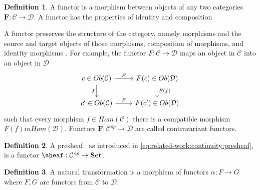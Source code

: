 \documentclass[10pt,journal,compsoc]{IEEEtran}
\theoremstyle{definition}
\newtheorem{definition}{Definition}[section]
\theoremstyle{remark}
\begin{document}
 \begin{definition} A functor is a morphism between objects of any two  categories $\bm{F}: \mathcal{C} \rightarrow \mathcal{D}$. A functor has the properties of identity and composition \cite{riehlCategoryTheoryContext}\end{definition}

A functor preserves the structure of the category, namely morphisms and the source and target objects of those morphisms, composition of morphisms, and identity morphisms \cite{riehlCategoryTheoryContext}. For example, the functor $F:\mathcal{C} \rightarrow \mathcal{D}$ maps an object in $\mathcal{C}$ into an object in $\mathcal{D}$
\begin{equation}
\label{eq:related-work:equivariance:functor_diagram}
\begin{tikzcd}
  c \in Ob(\mathcal{C}) \arrow[d, "f"'] \arrow[r, "F"] & F(c) \in Ob(\mathcal{D}) \arrow[d, "F(f)"] \\
  c^{\prime} \in Ob(\mathcal{C}) \arrow[r, "F"]        & F(c^{\prime}) \in Ob(\mathcal{D})         
  \end{tikzcd} 
\end{equation}
 such that every morphism $f \in Hom(\mathcal{C})$ there is a compatible morphism $F(f) in Hom(\mathcal{D})$. Functors $\bm{F}: \mathcal{C}^{op} \rightarrow \mathcal{D}$ are called contravariant functors.

 \begin{definition} A presheaf \sheafc\, as introduced in \autoref{eq:related-work:continuity:presheaf}, is a functor $\sheaf: \mathcal{C}^{op} \rightarrow \textbf{Set}$.\cite{nlab:presheaf} \end{definition}

 \begin{definition} A natural transformation is a morphism of functors $\alpha: F \rightarrow G$ where $F, G$ are functors from $\mathcal{C}$ to $\mathcal{D}$. \cite{riehlCategoryTheoryContext, bradleyWhatNaturalTransformation}
 \end{definition}
\end{document}
